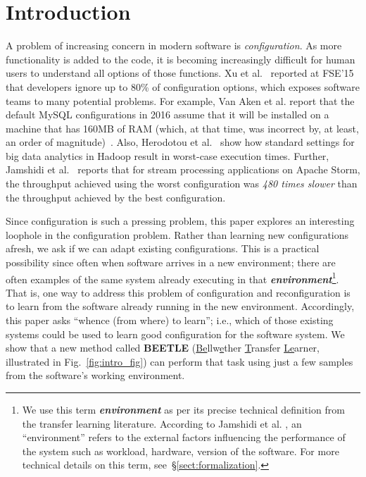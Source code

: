 \documentclass[10pt,journal,compsoc]{IEEEtran}
\newcommand{\tion}[1]{\S\ref{sect:#1}}
\newcommand{\fig}[1]{Fig.~\ref{fig:#1}}
\begin{document}
\section{Introduction} 
A problem of increasing concern in modern software is {\em configuration}.
As more  functionality
is added to the code, it is becoming increasingly difficult for human users to understand all options of those functions.
Xu et al.~\cite{xu2015hey} reported at FSE'15  that developers  ignore up 
to  80\% of configuration options, which exposes
software teams to many potential problems.
For example, Van Aken et al. report that the default MySQL configurations in 2016 assume that it will be installed on a machine that has  160MB of RAM (which, at that time, was incorrect by, at least, an order of magnitude)~\cite{van2017automatic}. Also,
Herodotou et al.~\cite{herodotou2011starfish} show how standard settings for big data analytics in Hadoop result in worst-case execution times. Further, Jamshidi et al.~\cite{JC:MASCOTS16} reports that for
stream processing applications on Apache Storm, the throughput achieved using the worst configuration was 
{\em 480 times slower} than the throughput achieved by the best configuration.

Since configuration is such a pressing problem,
this paper explores an interesting loophole in the configuration problem. Rather than learning new configurations afresh, we ask if we can adapt existing
configurations. This is a practical possibility since often when software arrives in a new environment; there are often examples of the same system
already executing in that \textbf{\textit{environment}}\footnote{We use
this term {\bf \textit{environment}} as per its precise technical definition from the transfer learning literature. According to
Jamshidi et al. \cite{jamshidi2017transfer2},
an ``environment'' refers to the external factors influencing the performance of the system such as workload, hardware, version of the software. For more technical details on this term, see~\tion{formalization}.}. That is, 
one way to address this problem of configuration and reconfiguration is to learn from the software already running in the new environment. Accordingly, this paper asks ``whence (from where) to learn''; i.e., which of those existing systems could be used to learn good configuration for the software system.
We show  that a new method called 
\textbf{BEETLE} (\underline{Be}llw\underline{e}ther \underline{T}ransfer \underline{Le}arner, illustrated in \fig{intro_fig}) can perform that task using just a few samples from the software's working environment.
\end{document}
